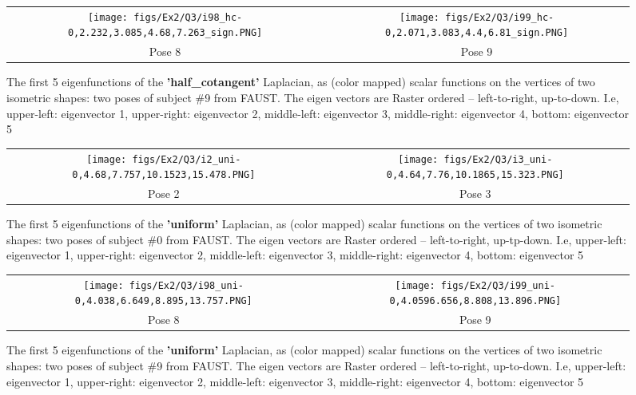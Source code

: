 \begin{figure*}[h]
\centering
\begin{tabular}{cc}
    \texttt{[image: figs/Ex2/Q3/i98\_hc-0,2.232,3.085,4.68,7.263\_sign.PNG]} &
    \texttt{[image: figs/Ex2/Q3/i99\_hc-0,2.071,3.083,4.4,6.81\_sign.PNG]} \\
    \small Pose 8 & \small Pose 9
\end{tabular}
 \caption{\small The first 5 eigenfunctions of the \textbf{'half\_cotangent'} Laplacian, as (color mapped) scalar
functions on the vertices of two isometric shapes: two poses of subject \#9 from FAUST. The eigen vectors are Raster ordered -- left-to-right, up-to-down. I.e, upper-left: eigenvector 1, upper-right: eigenvector 2, middle-left: eigenvector 3, middle-right: eigenvector 4, bottom: eigenvector 5}
 \label{fig:hc_eig_subj9}
\end{figure*}


\begin{figure*}[h]
\centering
\begin{tabular}{cc}
    \texttt{[image: figs/Ex2/Q3/i2\_uni-0,4.68,7.757,10.1523,15.478.PNG]} &
    \texttt{[image: figs/Ex2/Q3/i3\_uni-0,4.64,7.76,10.1865,15.323.PNG]} \\
    \small Pose 2 & \small Pose 3
\end{tabular}
 \caption{\small The first 5 eigenfunctions of the \textbf{'uniform'} Laplacian, as (color mapped) scalar
functions on the vertices of two isometric shapes: two poses of subject \#0 from FAUST. The eigen vectors are Raster ordered -- left-to-right, up-tp-down. I.e, upper-left: eigenvector 1, upper-right: eigenvector 2, middle-left: eigenvector 3, middle-right: eigenvector 4, bottom: eigenvector 5}
 \label{fig:uni_eig_subj0}
\end{figure*}

\begin{figure*}[h]
\centering
\begin{tabular}{cc}
    \texttt{[image: figs/Ex2/Q3/i98\_uni-0,4.038,6.649,8.895,13.757.PNG]} &
    \texttt{[image: figs/Ex2/Q3/i99\_uni-0,4.0596.656,8.808,13.896.PNG]} \\
    \small Pose 8 & \small Pose 9
\end{tabular}
 \caption{\small The first 5 eigenfunctions of the \textbf{'uniform'} Laplacian, as (color mapped) scalar
functions on the vertices of two isometric shapes: two poses of subject \#9 from FAUST. The eigen vectors are Raster ordered -- left-to-right, up-to-down. I.e, upper-left: eigenvector 1, upper-right: eigenvector 2, middle-left: eigenvector 3, middle-right: eigenvector 4, bottom: eigenvector 5}
 \label{fig:uni_eig_subj9}
\end{figure*}

